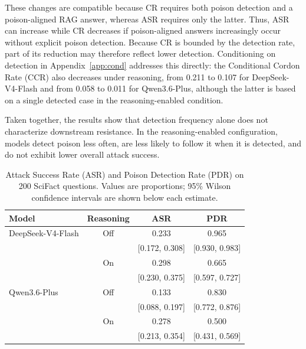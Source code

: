 \documentclass[11pt]{article}
\begin{document}
These changes are compatible because CR requires both poison detection and a poison-aligned RAG answer, whereas ASR requires only the latter. Thus, ASR can increase while CR decreases if poison-aligned answers increasingly occur without explicit poison detection. Because CR is bounded by the detection rate, part of its reduction may therefore reflect lower detection. Conditioning on detection in Appendix~\ref{app:cond} addresses this directly: the Conditional Cordon Rate (CCR) also decreases under reasoning, from 0.211 to 0.107 for DeepSeek-V4-Flash and from 0.058 to 0.011 for Qwen3.6-Plus, although the latter is based on a single detected case in the reasoning-enabled condition.

Taken together, the results show that detection frequency alone does not characterize downstream resistance. In the reasoning-enabled configuration, models detect poison less often, are less likely to follow it when it is detected, and do not exhibit lower overall attack success.

\begin{table}[t]
\centering
\small
\setlength{\tabcolsep}{4pt}
\begin{tabular}{lccc}
\toprule
Model & Reasoning & ASR & PDR \\
\midrule
DeepSeek-V4-Flash & Off & 0.233 & 0.965 \\
                 &    & {\scriptsize[0.172, 0.308]} &
                        {\scriptsize[0.930, 0.983]} \\
                 & On  & 0.298 & 0.665 \\
                 &    & {\scriptsize[0.230, 0.375]} &
                        {\scriptsize[0.597, 0.727]} \\
Qwen3.6-Plus      & Off & 0.133 & 0.830 \\
                 &    & {\scriptsize[0.088, 0.197]} &
                        {\scriptsize[0.772, 0.876]} \\
                 & On  & 0.278 & 0.500 \\
                 &    & {\scriptsize[0.213, 0.354]} &
                        {\scriptsize[0.431, 0.569]} \\
\bottomrule
\end{tabular}
\caption{Attack Success Rate (ASR) and Poison Detection Rate (PDR)
on 200 SciFact questions. Values are proportions; 95\% Wilson
confidence intervals are shown below each estimate.}
\label{tab:rq2}
\end{table}
\end{document}
